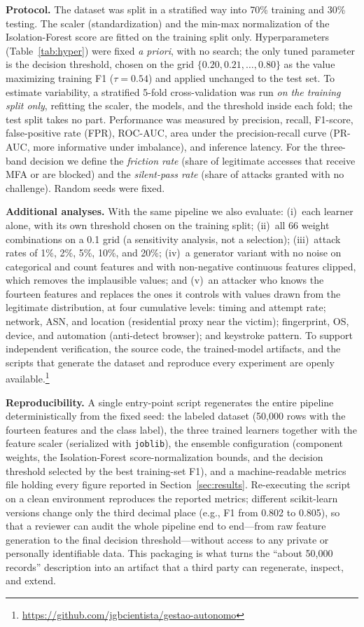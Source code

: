 \documentclass[conference]{IEEEtran}
\begin{document}
\textbf{Protocol.} The dataset was split in a stratified way into 70\%
training and 30\% testing. The scaler (standardization) and the min-max
normalization of the Isolation-Forest score are fitted on the training
split only. Hyperparameters (Table~\ref{tab:hyper}) were fixed
\emph{a priori}, with no search; the only tuned parameter is the decision
threshold, chosen on the grid $\{0.20, 0.21, \dots, 0.80\}$ as the value
maximizing training F1 ($\tau=0.54$) and applied unchanged to the test
set. To estimate variability, a stratified 5-fold cross-validation was
run \emph{on the training split only}, refitting the scaler, the models,
and the threshold inside each fold; the test split takes no part.
Performance was measured by precision, recall, F1-score, false-positive
rate (FPR), ROC-AUC, area under the precision-recall curve (PR-AUC, more
informative under imbalance), and inference latency. For the three-band
decision we define the \emph{friction rate} (share of legitimate accesses
that receive MFA or are blocked) and the \emph{silent-pass rate} (share of
attacks granted with no challenge). Random seeds were fixed.

\textbf{Additional analyses.} With the same pipeline we also evaluate:
(i)~each learner alone, with its own threshold chosen on the training
split; (ii)~all 66 weight combinations on a 0.1 grid (a sensitivity
analysis, not a selection); (iii)~attack rates of 1\%, 2\%, 5\%, 10\%, and
20\%; (iv)~a generator variant with no noise on categorical and count
features and with non-negative continuous features clipped, which removes
the implausible values; and (v)~an attacker who knows the fourteen
features and replaces the ones it controls with values drawn from the
legitimate distribution, at four cumulative levels: timing and attempt
rate; network, ASN, and location (residential proxy near the victim);
fingerprint, OS, device, and automation (anti-detect browser); and
keystroke pattern.
To support independent verification, the
source code, the trained-model artifacts, and the scripts that generate
the dataset and reproduce every experiment are openly
available.\footnote{\url{https://github.com/jgbcientista/gestao-autonomo}}

\textbf{Reproducibility.} A single entry-point script regenerates the
entire pipeline deterministically from the fixed seed: the labeled
dataset (50{,}000 rows with the fourteen features and the class label),
the three trained learners together with the feature scaler (serialized
with \texttt{joblib}), the ensemble configuration (component weights,
the Isolation-Forest score-normalization bounds, and the decision
threshold selected by the best training-set F1), and a machine-readable
metrics file holding every figure reported in
Section~\ref{sec:results}. Re-executing the script on a clean
environment reproduces the reported metrics; different scikit-learn
versions change only the third decimal place (e.g., F1 from 0.802 to
0.805), so that a reviewer can audit the whole pipeline end to end---from raw
feature generation to the final decision threshold---without access to
any private or personally identifiable data. This packaging is what
turns the ``about 50{,}000 records'' description into an artifact that a
third party can regenerate, inspect, and extend.
\end{document}
